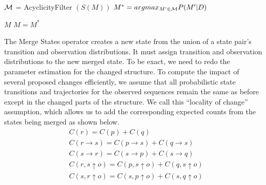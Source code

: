 \documentclass[letterpaper]{article}
\begin{document}
\begin{algorithm}
\footnotesize
\begin{algorithmic}

                        \State ${\cal M}$ = AcyclicityFilter $(S(M))$ 
			\State $M^* = argmax_{M^\prime \in {\cal M}} P(M^\prime|D)$

				\State \Return $M$
			\Else
				\State $M = M^*$
			\EndIf

		\EndWhile
	\EndProcedure
\end{algorithmic}
\caption{}
\label{learningAlg}
\end{algorithm}

The Merge States operator creates a new state from the union of a state pair's transition and observation distributions.  
It must assign transition and observation distributions to the new merged 
state. To be exact, we need to redo the parameter estimation for the changed 
structure. To compute the impact of several proposed changes efficiently,
we assume that all probabilistic state transitions and trajectories for 
the observed sequences remain the same as before except in the changed 
parts of the structure. We call this ``locality of change'' assumption, which 
allows us to 
add the corresponding expected counts from the states being merged as shown below. %
{\footnotesize
\begin{align}
&C(r) = C(p) + C(q) \nonumber\\
&C(r \rightarrow s) = C(p \rightarrow s) +  C(q \rightarrow s) \nonumber \\
&C(s \rightarrow r) = C(s \rightarrow p) +  C(s \rightarrow q) \nonumber \\
&C(r,s \uparrow o) = C(p,s \uparrow o) +  C(q,s \uparrow o) \nonumber \\
&C(s,r \uparrow o) = C(s,p \uparrow o) +  C(s,q \uparrow o) \nonumber 
\end{align}
\vspace{-.2in}
}%

\end{document}
